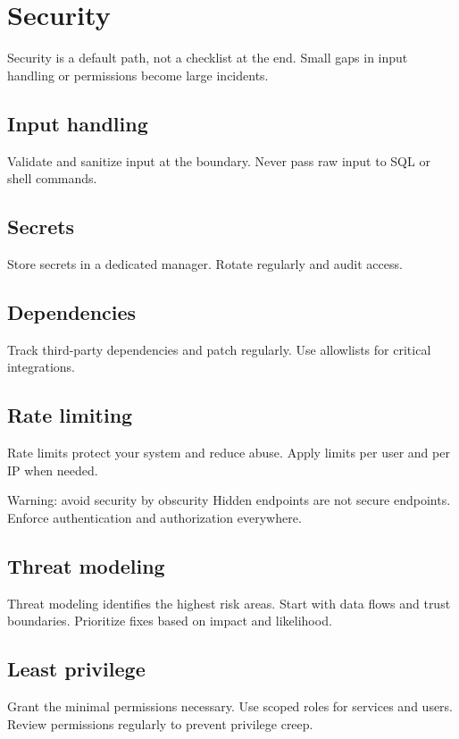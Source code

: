 \chapter{Security}

Security is a default path, not a checklist at the end.
Small gaps in input handling or permissions become large incidents.

\section{Input handling}
Validate and sanitize input at the boundary.
Never pass raw input to SQL or shell commands.

\section{Secrets}
Store secrets in a dedicated manager.
Rotate regularly and audit access.

\section{Dependencies}
Track third-party dependencies and patch regularly.
Use allowlists for critical integrations.

\section{Rate limiting}
Rate limits protect your system and reduce abuse.
Apply limits per user and per IP when needed.

\begin{warningbox}{Warning: avoid security by obscurity}
Hidden endpoints are not secure endpoints.
Enforce authentication and authorization everywhere.
\end{warningbox}

\section{Threat modeling}
Threat modeling identifies the highest risk areas.
Start with data flows and trust boundaries.
Prioritize fixes based on impact and likelihood.

\section{Least privilege}
Grant the minimal permissions necessary.
Use scoped roles for services and users.
Review permissions regularly to prevent privilege creep.

